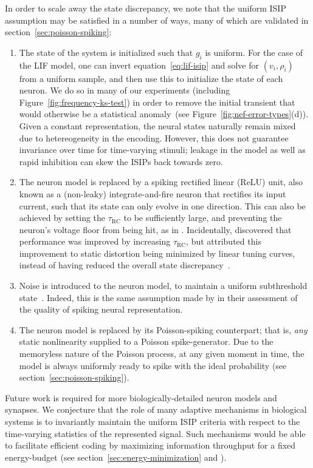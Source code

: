 In order to scale away the state discrepancy, we note that the uniform ISIP assumption may be satisfied in a number of ways, many of which are validated in
section~\ref{sec:poisson-spiking}:
\begin{enumerate}
\item The state of the system is initialized such that $g_i$ is uniform.
For the case of the LIF model, one can invert equation~\ref{eq:lif-isip} and solve for $(v_i, \rho_i)$ from a uniform sample, and then use this to initialize the state of each neuron.
We do so in many of our experiments (including Figure~\ref{fig:frequency-ks-test}) in order to remove the initial transient that would otherwise be a statistical anomaly~(see Figure~\ref{fig:nef-error-types}(d)).
Given a constant representation, the neural states naturally remain mixed due to hetereogeneity in the encoding.
However, this does not guarantee invariance over time for time-varying stimuli; leakage in the model as well as rapid inhibition can skew the ISIPs back towards zero.

\item The neuron model is replaced by a spiking rectified linear (ReLU) unit, also known as a (non-leaky) integrate-and-fire neuron that rectifies its input current, such that its state can only evolve in one direction.
This can also be achieved by setting the $\tau_\text{RC}$ to be sufficiently large, and preventing the neuron's voltage floor from being hit, as in \citet{boerlin2013predictive}.
Incidentally, \citet[][pp.~238--239]{eliasmith2003a} discovered that performance was improved by increasing $\tau_\text{RC}$, but attributed this improvement to static distortion being minimized by linear tuning curves, instead of having reduced the overall state discrepancy~\citep[also see][appendix~F.1]{eliasmith2003a}.

\item Noise is introduced to the neuron model, to maintain a uniform subthreshold state~\citep[][pp.~132--133]{eliasmith2003a}.
Indeed, this is the same assumption made by \citet[][p.~134]{eliasmith2003a} in their assessment of the quality of spiking neural representation.

\item The neuron model is replaced by its Poisson-spiking counterpart; that is, \emph{any} static nonlinearity supplied to a Poisson spike-generator.
Due to the memoryless nature of the Poisson process, at any given moment in time, the model is always uniformly ready to spike with the ideal probability (see section~\ref{sec:poisson-spiking}).

\end{enumerate}
Future work is required for more biologically-detailed neuron models and synapses.
We conjecture that the role of many adaptive mechanisms in biological systems is to invariantly maintain the uniform ISIP criteria with respect to the time-varying statistics of the represented signal.
Such mechanisms would be able to facilitate efficient coding by maximizing information throughput for a fixed energy-budget (see section~\ref{sec:energy-minimization} and \citet[][pp.~127,~Table~4.1]{eliasmith2003a}).

